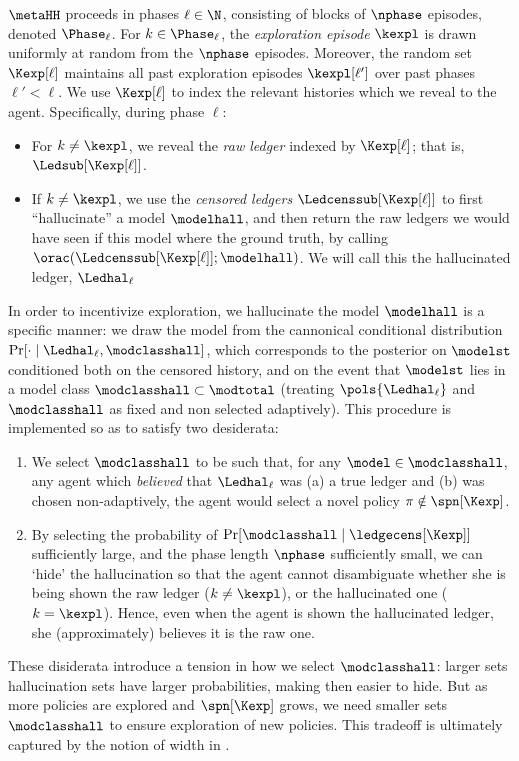 $\metaHH$ proceeds in phases $\ell \in \N$, consisting of blocks of $\nphase$ episodes, denoted $\Phase_{\ell}$. For $k \in \Phase_{\ell}$, the \emph{exploration episode} $\kexpl$ is drawn uniformly at random from the $\nphase$ episodes. Moreover, the random set $\Kexp[\ell]$ maintains all past exploration episodes $\kexpl[\ell']$ over past phases $\ell'< \ell$. We use $\Kexp[\ell]$ to index the relevant histories which we reveal to the agent. Specifically, during phase $\ell$:
\begin{itemize}
	\item For $k \ne \kexpl$, we reveal the \emph{raw ledger} indexed by $\Kexp[\ell]$; that is, $\Ledsub[\Kexp[\ell]]$. 
	\item If $k \ne \kexpl$, we use the \emph{censored ledgers} $\Ledcenssub[\Kexp[\ell]]$ to first ``hallucinate'' a model $\modelhall$, and then return the raw ledgers we would have seen if this model where the ground truth, by calling $\orac(\Ledcenssub[\Kexp[\ell]];\modelhall)$. We will call this the hallucinated ledger, $\Ledhal_{\ell}$
\end{itemize}
In order to incentivize exploration, we  hallucinate the model $\modelhall$ is a specific manner: we draw the model from the cannonical conditional distribution $\Pr[\cdot \mid \Ledhal_{\ell}, \modclasshall]$, which corresponds to the posterior on $\modelst$ conditioned both  on the censored history, and on the event that $\modelst$ lies in a model class $\modclasshall \subset \modtotal$ (treating $\pols{\Ledhal_{\ell}}$ and $\modclasshall$ as fixed and non selected adaptively). This procedure is implemented so as to satisfy two desiderata:
\begin{enumerate}
\item We select $\modclasshall$ to be such that, for any $\model \in \modclasshall$, any agent which \emph{believed} that $\Ledhal_{\ell}$ was (a) a true ledger and (b) was chosen non-adaptively, the agent would select a novel policy $\pi \notin \spn[\Kexp]$.
\item By selecting the probability of $\Pr[\modclasshall \mid \ledgecens[\Kexp]]$ sufficiently large, and the phase length $\nphase$ sufficiently small, we can `hide' the hallucination so that the agent cannot disambiguate whether she is being shown the raw ledger ($k \ne \kexpl$),  or the hallucinated one (  $k = \kexpl$). Hence, even when the agent is shown the hallucinated ledger, she (approximately) believes it is the raw one. 
\end{enumerate}
These disiderata introduce a tension in how we select $\modclasshall$: larger sets hallucination sets have larger probabilities, making then easier to hide. But as more policies are explored and $\spn[\Kexp]$ grows, we need smaller sets $\modclasshall$ to ensure exploration of new policies. This tradeoff is ultimately captured by the notion of width in .


